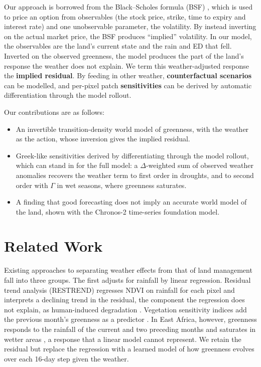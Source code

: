 \documentclass[letterpaper]{article} %
\begin{document}
Our approach is borrowed from the Black--Scholes formula (BSF) \citep{bs}, which is used to price an option from observables (the stock price, strike, time to expiry and interest rate) and one unobservable parameter, the volatility. By instead inverting on the actual market price, the BSF produces ``implied'' volatility. In our model, the observables are the land's current state and the rain and ED that fell. Inverted on the observed greenness, the model produces the part of the land's response the weather does not explain. We term this weather-adjusted response the \textbf{implied residual}. By feeding in other weather, \textbf{counterfactual scenarios} can be modelled, and per-pixel patch \textbf{sensitivities} can be derived by automatic differentiation through the model rollout.

Our contributions are as follows:
\begin{itemize}
    \item An invertible transition-density world model of greenness, with the weather as the action, whose inversion gives the implied residual.
    \item Greek-like sensitivities derived by differentiating through the model rollout, which can stand in for the full model: a $\Delta$-weighted sum of observed weather anomalies recovers the weather term to first order in droughts, and to second order with $\Gamma$ in wet seasons, where greenness saturates.
    \item A finding that good forecasting does not imply an accurate world model of the land, shown with the Chronos-2 time-series foundation model.
\end{itemize}


\section{Related Work}

Existing approaches to separating weather effects from that of land management fall into three groups. The first adjusts for rainfall by linear regression. Residual trend analysis (RESTREND) regresses NDVI on rainfall for each pixel and interprets a declining trend in the residual, the component the regression does not explain, as human-induced degradation \citep{evans2004}. Vegetation sensitivity indices add the previous month's greenness as a predictor \citep{seddon2016}. In East Africa, however, greenness responds to the rainfall of the current and two preceding months and saturates in wetter areas \citep{davenport1993}, a response that a linear model cannot represent. We retain the residual but replace the regression with a learned model of how greenness evolves over each 16-day step given the weather.
\end{document}
